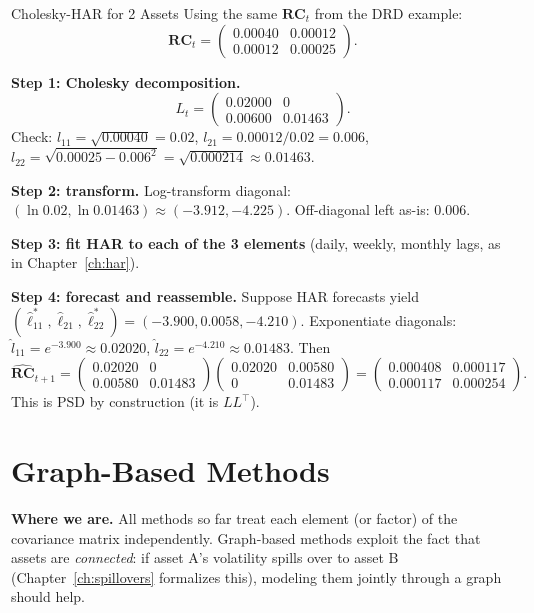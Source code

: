 \begin{workedexample}{Cholesky-HAR for 2 Assets}
Using the same $\mathbf{RC}_t$ from the DRD example:
\[
  \mathbf{RC}_t = \begin{pmatrix} 0.00040 & 0.00012 \\ 0.00012 & 0.00025 \end{pmatrix}.
\]

\textbf{Step 1: Cholesky decomposition.}
\[
  L_t = \begin{pmatrix} 0.02000 & 0 \\ 0.00600 & 0.01463 \end{pmatrix}.
\]
Check: $l_{11} = \sqrt{0.00040} = 0.02$,\;
$l_{21} = 0.00012 / 0.02 = 0.006$,\;
$l_{22} = \sqrt{0.00025 - 0.006^2} = \sqrt{0.000214} \approx 0.01463$.

\textbf{Step 2: transform.}
Log-transform diagonal: $(\ln 0.02, \ln 0.01463) \approx (-3.912, -4.225)$.
Off-diagonal left as-is: $0.006$.

\textbf{Step 3: fit HAR to each of the 3 elements} (daily, weekly, monthly
lags, as in Chapter~\ref{ch:har}).

\textbf{Step 4: forecast and reassemble.}
Suppose HAR forecasts yield $(\hat{\ell}_{11}^*, \hat{\ell}_{21}, \hat{\ell}_{22}^*)
= (-3.900, 0.0058, -4.210)$. Exponentiate diagonals:
$\hat{l}_{11} = e^{-3.900} \approx 0.02020$, $\hat{l}_{22} = e^{-4.210} \approx 0.01483$.
Then
\[
  \widehat{\mathbf{RC}}_{t+1}
  = \begin{pmatrix} 0.02020 & 0 \\ 0.00580 & 0.01483 \end{pmatrix}
    \begin{pmatrix} 0.02020 & 0.00580 \\ 0 & 0.01483 \end{pmatrix}
  = \begin{pmatrix} 0.000408 & 0.000117 \\ 0.000117 & 0.000254 \end{pmatrix}.
\]
This is PSD by construction (it is $LL^\top$).
\end{workedexample}


\section{Graph-Based Methods}\label{sec:multivariate:graph}

\textbf{Where we are.}  All methods so far treat each element (or factor) of
the covariance matrix independently. Graph-based methods exploit the fact that
assets are \emph{connected}: if asset A's volatility spills over to asset B
(Chapter~\ref{ch:spillovers} formalizes this), modeling them jointly through
a graph should help.

